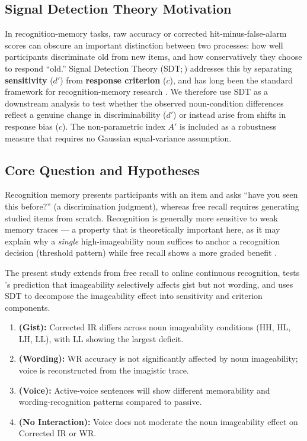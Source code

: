 \documentclass[12pt, a4paper]{article}
\begin{document}
\subsection{Signal Detection Theory Motivation}
\label{sec:sdt_lit}

In recognition-memory tasks, raw accuracy or corrected hit-minus-false-alarm
scores can obscure an important distinction between two processes: how well
participants discriminate old from new items, and how conservatively they
choose to respond ``old.'' Signal Detection Theory (SDT;\,\citealt{green1966})
addresses this by separating \textbf{sensitivity} ($d'$) from
\textbf{response criterion} ($c$), and has long been the standard framework
for recognition-memory research \citep{macmillan2005}. We therefore use SDT
as a downstream analysis to test whether the observed noun-condition
differences reflect a genuine change in discriminability ($d'$) or instead
arise from shifts in response bias ($c$). The non-parametric index $A'$
\citep{snodgrass1988} is included as a robustness measure that requires no
Gaussian equal-variance assumption.

\subsection{Core Question and Hypotheses}

Recognition memory presents participants with an item and asks ``have
you seen this before?'' (a discrimination judgment), whereas free recall
requires generating studied items from scratch. Recognition is generally
more sensitive to weak memory traces --- a property that is theoretically
important here, as it may explain why a \emph{single} high-imageability
noun suffices to anchor a recognition decision (threshold pattern) while
free recall shows a more graded benefit \citep{james1973}.

The present study extends \citet{james1973} from free recall to online
continuous recognition, tests \citet{begg1971}'s prediction that
imageability selectively affects gist but not wording, and uses SDT to
decompose the imageability effect into sensitivity and criterion components.

\begin{enumerate}[label=\textbf{H\arabic*:}]
  \item \textbf{(Gist):} Corrected IR differs across noun imageability
  conditions (HH, HL, LH, LL), with LL showing the largest deficit.
  \item \textbf{(Wording):} WR accuracy is not significantly affected by
  noun imageability; voice is reconstructed from the imagistic trace.
  \item \textbf{(Voice):} Active-voice sentences will show different
  memorability and wording-recognition patterns compared to passive.
  \item \textbf{(No Interaction):} Voice does not moderate the noun
  imageability effect on Corrected IR or WR.
\end{enumerate}
\end{document}
